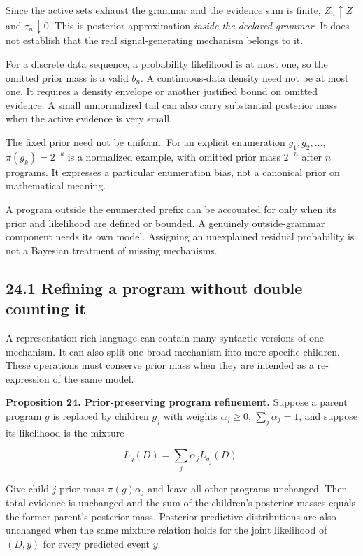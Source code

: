\documentclass[11pt,letterpaper]{article}
\begin{document}
Since the active sets exhaust the grammar and the evidence sum is
finite, \(Z_n\uparrow Z\) and \(\tau_n\downarrow0\). This is posterior
approximation \emph{inside the declared grammar}. It does not establish
that the real signal-generating mechanism belongs to it.

For a discrete data sequence, a probability likelihood is at most one,
so the omitted prior mass is a valid \(b_n\). A continuous-data density
need not be at most one. It requires a density envelope or another
justified bound on omitted evidence. A small unnormalized tail can also
carry substantial posterior mass when the active evidence is very small.

The fixed prior need not be uniform. For an explicit enumeration
\(g_1,g_2,\ldots\), \(\pi(g_k)=2^{-k}\) is a normalized example, with
omitted prior mass \(2^{-n}\) after \(n\) programs. It expresses a
particular enumeration bias, not a canonical prior on mathematical
meaning.

A program outside the enumerated prefix can be accounted for only when
its prior and likelihood are defined or bounded. A genuinely
outside-grammar component needs its own model. Assigning an unexplained
residual probability is not a Bayesian treatment of missing mechanisms.

\subsection{24.1 Refining a program without double counting
it}\label{refining-a-program-without-double-counting-it}

A representation-rich language can contain many syntactic versions of
one mechanism. It can also split one broad mechanism into more specific
children. These operations must conserve prior mass when they are
intended as a re-expression of the same model.

\textbf{Proposition 24. Prior-preserving program refinement.} Suppose a
parent program \(g\) is replaced by children \(g_j\) with weights
\(\alpha_j\geq0\), \(\sum_j\alpha_j=1\), and suppose its likelihood is
the mixture

\[
L_g(D)=\sum_j\alpha_jL_{g_j}(D).
\]

Give child \(j\) prior mass \(\pi(g)\alpha_j\) and leave all other
programs unchanged. Then total evidence is unchanged and the sum of the
children's posterior masses equals the former parent's posterior mass.
Posterior predictive distributions are also unchanged when the same
mixture relation holds for the joint likelihood of \((D,y)\) for every
predicted event \(y\).
\end{document}
